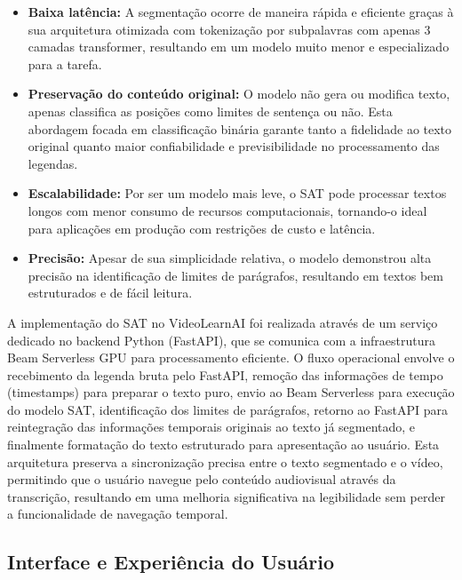 \documentclass[tcc,capa]{texufpel}
\begin{document}
\begin{itemize}
    \item \textbf{Baixa latência:} A segmentação ocorre de maneira rápida e eficiente graças à sua arquitetura otimizada com tokenização por subpalavras com apenas 3 camadas transformer, resultando em um modelo muito menor e especializado para a tarefa.
    
    \item \textbf{Preservação do conteúdo original:} O modelo não gera ou modifica texto, apenas classifica as posições como limites de sentença ou não. Esta abordagem focada em classificação binária garante tanto a fidelidade ao texto original quanto maior confiabilidade e previsibilidade no processamento das legendas.
    
    \item \textbf{Escalabilidade:} Por ser um modelo mais leve, o SAT pode processar textos longos com menor consumo de recursos computacionais, tornando-o ideal para aplicações em produção com restrições de custo e latência.
    
    \item \textbf{Precisão:} Apesar de sua simplicidade relativa, o modelo demonstrou alta precisão na identificação de limites de parágrafos, resultando em textos bem estruturados e de fácil leitura.
\end{itemize}

A implementação do SAT no VideoLearnAI foi realizada através de um serviço dedicado no backend Python (FastAPI), que se comunica com a infraestrutura Beam Serverless GPU para processamento eficiente. O fluxo operacional envolve o recebimento da legenda bruta pelo FastAPI, remoção das informações de tempo (timestamps) para preparar o texto puro, envio ao Beam Serverless para execução do modelo SAT, identificação dos limites de parágrafos, retorno ao FastAPI para reintegração das informações temporais originais ao texto já segmentado, e finalmente formatação do texto estruturado para apresentação ao usuário. Esta arquitetura preserva a sincronização precisa entre o texto segmentado e o vídeo, permitindo que o usuário navegue pelo conteúdo audiovisual através da transcrição, resultando em uma melhoria significativa na legibilidade sem perder a funcionalidade de navegação temporal.

\subsection{Interface e Experiência do Usuário}
\end{document}
